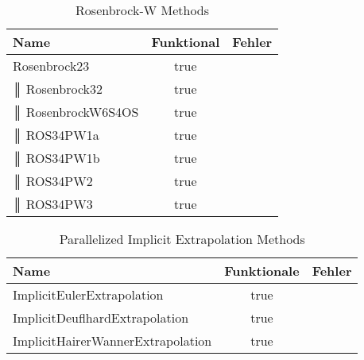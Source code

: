 \begin{table}[H]
    \centering

    \begin{tabular}{p{5cm}|c|p{5cm}}
        Name & Funktional & Fehler \\
        \hline\hline
        Rosenbrock23     & true & \\                                                                                                                          ║
        Rosenbrock32     & true & \\                                                                                                                          ║
        RosenbrockW6S4OS & true & \\                                                                                                                      ║
        ROS34PW1a        & true & \\                                                                                                                             ║
        ROS34PW1b        & true & \\                                                                                                                             ║
        ROS34PW2    & true & \\                                                                                                                              ║
        ROS34PW3         & true & \\            
    \end{tabular}
    \caption{Rosenbrock-W Methods}
    \label{tab:my_label}
\end{table}

\begin{table}[H]
    \centering

    \begin{tabular}{p{10cm}|c|p{1cm}}
        Name & Funktionale & Fehler \\
        \hline\hline
            ImplicitEulerExtrapolation & true & \\ 
            ImplicitDeuflhardExtrapolation & true & \\ 
            ImplicitHairerWannerExtrapolation & true & \\ 
    \end{tabular}
    \caption{Parallelized Implicit Extrapolation Methods}
    \label{tab:my_label}
\end{table}

